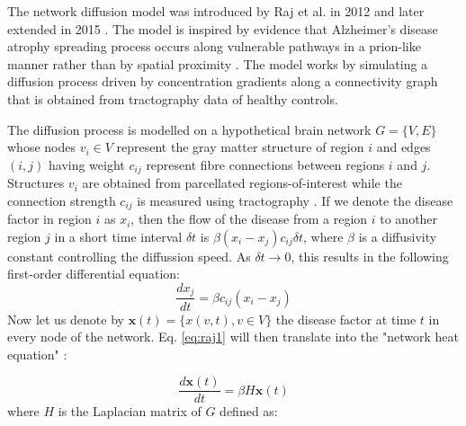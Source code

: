 The network diffusion model was introduced by Raj et al. in 2012 \cite{raj2012network} and later extended in 2015 \cite{raj2015network}. The model is inspired by evidence that Alzheimer's disease atrophy spreading process occurs along vulnerable pathways in a prion-like manner rather than by spatial proximity \cite{villain2010sequential,englund1988white,kuczynski2010white}. The model works by simulating a diffusion process driven by concentration gradients along a connectivity graph that is obtained from tractography data of healthy controls. 

The diffusion process is modelled on a hypothetical brain network $G = \{V,E\}$ whose nodes $v_i \in V$ represent the gray matter structure of region $i$ and edges $(i,j)$ having weight $c_{ij}$ represent fibre connections between regions $i$ and $j$. Structures $v_i$ are obtained from parcellated regions-of-interest while the connection strength $c_{ij}$ is measured using tractography \cite{behrens2007probabilistic}. If we denote the disease factor in region $i$ as $x_i$, then the flow of the disease from a region $i$ to another region $j$ in a short time interval $\delta t$ is $\beta(x_i - x_j)c_{ij}\delta t$, where $\beta$ is a diffusivity constant controlling the diffussion speed. As $\delta t \to 0$, this results in the following first-order differential equation:
\begin{equation}
\label{eq:raj1}
 \frac{dx_j}{dt} = \beta c_{ij}(x_i - x_j)
\end{equation}
Now let us denote by $\textbf{x}(t) = \{x(v,t), v \in V \}$ the disease factor at time $t$ in every node of the network. Eq. \ref{eq:raj1} will then translate into the "network heat equation" \cite{kondor2002diffusion}:

\begin{equation}
\label{eq:raj2}
 \frac{d\textbf{x}(t)}{dt} = \beta H \textbf{x}(t)
\end{equation}
where $H$ is the Laplacian matrix of $G$ defined as:

